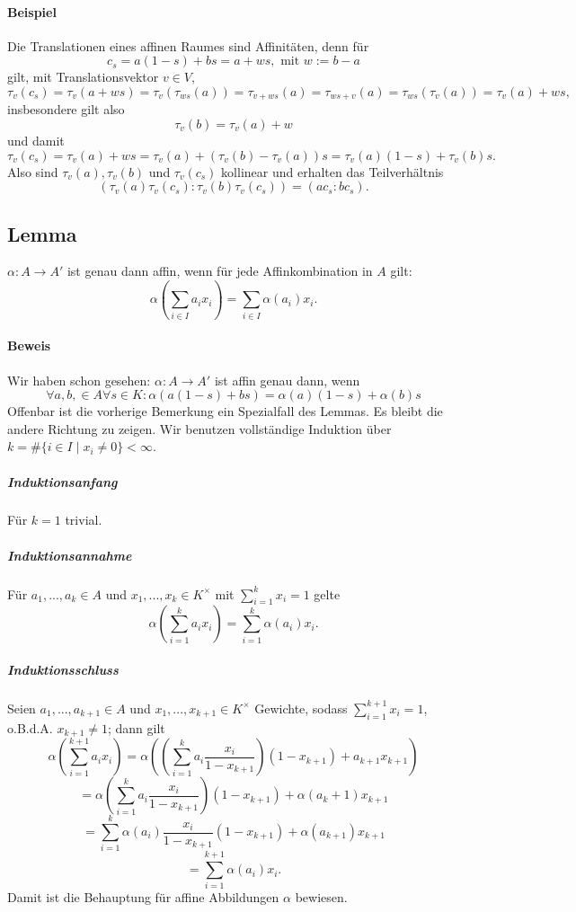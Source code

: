  	\paragraph{Beispiel}
 		Die Translationen eines affinen Raumes sind Affinitäten, denn für
 		\[
 			c_s = a(1-s)+bs = a + ws, \text{ mit } w:=b-a
 		\]
 		gilt, mit Translationsvektor $ v\in V $,
 		\[
 			\tau_v(c_s) = \tau_v(a+ws) = \tau_v(\tau_{ws}(a)) = \tau_{v+ws}(a) = \tau_{ws+v}(a) = \tau_{ws}(\tau_v(a)) =  \tau_v(a) + ws,
 		\]
 		insbesondere gilt also
 		\[
 			\tau_v(b) = \tau_v(a)+w
 		\]
 		und damit
 		\[
 			\tau_v(c_s) = \tau_v(a)+ws = \tau_v(a)+(\tau_v(b)-\tau_v(a))s = \tau_v(a)(1-s)+\tau_v(b)s.
 		\]
 		Also sind $ \tau_v(a),\tau_v(b) $ und $ \tau_v(c_s) $ kollinear und erhalten das Teilverhältnis
 		\[
 			(\tau_v(a)\tau_v(c_s):\tau_v(b)\tau_v(c_s)) = (ac_s:bc_s).
 		\]

 \subsection{Lemma}
 	\begin{Lemma}[]
 		$ \alpha:A\to A' $ ist genau dann affin, wenn für jede Affinkombination in $ A $ gilt:
 		\[
 			\alpha(\sum_{i\in I}a_ix_i) = \sum_{i\in I} \alpha(a_i)x_i.
 		\]
 	\end{Lemma}

 	\paragraph{Beweis}
 		Wir haben schon gesehen: $ \alpha:A\to A' $ ist affin genau dann, wenn
 		\[
 			\forall a,b,\in A\forall s\in K:\alpha(a(1-s)+bs) = \alpha(a)(1-s)+\alpha(b)s
 		\]
 		Offenbar ist die vorherige Bemerkung ein Spezialfall des Lemmas. Es bleibt die andere Richtung zu zeigen. Wir benutzen vollständige Induktion über $k = \#\{{i\in I}\mid x_i\neq 0\}<\infty $.

 		\subparagraph{Induktionsanfang}
 			Für $ k=1 $ trivial.

 		\subparagraph{Induktionsannahme}
 			Für $ a_1,...,a_k\in A $ und $ x_1,...,x_k \in K^\times$ mit $ \sum_{i=1}^{k}x_i=1 $ gelte
 			\[
 				\alpha(\sum_{i=1}^{k}a_ix_i) = \sum_{i=1}^{k}\alpha(a_i)x_i.
 			\]

 		\subparagraph{Induktionsschluss}
 			Seien $ a_1,...,a_{k+1} \in A$ und $ x_1,...,x_{k+1} \in K^\times$ Gewichte, sodass $ \sum_{i=1}^{k+1}x_i = 1 $, o.B.d.A. $ x_{k+1}\neq 1 $; dann gilt
 			\[
 				\alpha(\sum_{i=1}^{k+1}a_ix_i) = \alpha((\sum_{i=1}^{k}a_i\frac{x_i}{1-x_{k+1}})(1-x_{k+1})+a_{k+1}x_{k+1})
 			\]
 			\[
 				= \alpha(\sum_{i=1}^{k}a_i\frac{x_i}{1-x_{k+1}})(1-x_{k+1})+\alpha(a_k+1)x_{k+1}
 			\]
 			\[
 				= \sum_{i=1}^{k}\alpha(a_i)\frac{x_i}{1-x_{k+1}}(1-x_{k+1})+\alpha(a_{k+1})x_{k+1}
 			\]
 			\[
 				= \sum_{i=1}^{k+1}\alpha(a_i)x_i.
 			\]
 			Damit ist die Behauptung für affine Abbildungen $ \alpha $ bewiesen.

